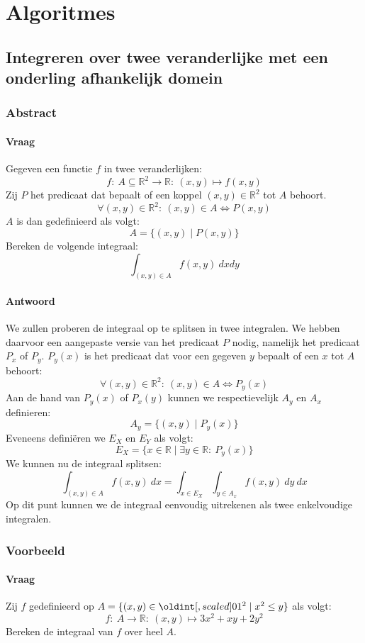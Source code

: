 \documentclass[main.tex]{subfiles}
\begin{document}
\chapter{Algoritmes}
\label{cha:algoritmes}

\section{Integreren over twee veranderlijke met een onderling afhankelijk domein}
\subsection*{Abstract}
\subsubsection*{Vraag}
Gegeven een functie $f$ in twee veranderlijken:
\[ f:\ A \subseteq \mathbb{R}^{2} \rightarrow \mathbb{R}:\ (x,y) \mapsto f(x,y) \]
Zij $P$ het predicaat dat bepaalt of een koppel $(x,y)\in\mathbb{R}^{2}$ tot $A$ behoort.
\[ \forall (x,y) \in \mathbb{R}^{2}:\ (x,y)\in A \Leftrightarrow P(x,y) \]
$A$ is dan gedefinieerd als volgt:
\[ A = \{ (x,y) \mid P(x,y) \} \]
Bereken de volgende integraal:
\[ \int_{(x,y)\in A}f(x,y)\ dx dy \]

\subsubsection*{Antwoord}
We zullen proberen de integraal op te splitsen in twee integralen.
We hebben daarvoor een aangepaste versie van het predicaat $P$ nodig, namelijk het predicaat $P_{x}$ of $P_{y}$.
$P_{y}(x)$ is het predicaat dat voor een gegeven $y$ bepaalt of een $x$ tot $A$ behoort:
\[ \forall (x,y) \in \mathbb{R}^{2}:\ (x,y)\in A \Leftrightarrow P_{y}(x) \]
Aan de hand van $P_{y}(x)$ of $P_{x}(y)$ kunnen we respectievelijk $A_{y}$ en $A_{x}$ definieren:
\[ A_{y} = \{ (x,y) \mid P_{y}(x) \} \]
Eveneens defini\"eren we $E_{X}$ en $E_{Y}$ als volgt:
\[ E_{X} = \{ x \in\mathbb{R} \mid \exists y \in \mathbb{R}:\ P_{y}(x) \} \]
We kunnen nu de integraal splitsen:
\[ \int_{(x,y)\in A}f(x,y)\ dx = \int_{x\in E_{X}}\int_{y\in A_{x}}f(x,y)\ dy\ dx \]
Op dit punt kunnen we de integraal eenvoudig uitrekenen als twee enkelvoudige integralen.

\subsection*{Voorbeeld}
\subsubsection*{Vraag}
Zij $f$ gedefinieerd op $A = \{ (x,y)\in \interval{0}{1}^{2} \mid x^{2} \le y \}$ als volgt:
\[ f:\ A \rightarrow \mathbb{R}:\ (x,y) \mapsto 3x^{2} + xy + 2y^{2} \]
Bereken de integraal van $f$ over heel $A$.
\end{document}
